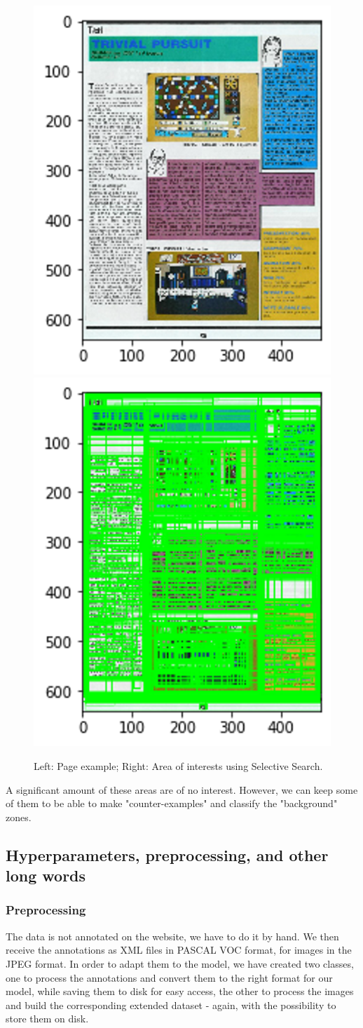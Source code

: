 \documentclass[10pt,conference,compsocconf]{IEEEtran}
\begin{document}
\begin{figure}[htbp]
    \centering
    \includegraphics[width=0.5\columnwidth]{example_page.png}\includegraphics[width=0.5\columnwidth]{example_page_ss.png}
    \caption{Left: Page example; Right: Area of interests using Selective Search.}
    \vspace{-3mm}
    \label{fig:pages-example}
\end{figure}

A significant amount of these areas are of no interest. However, we can keep some of them to be able to make "counter-examples" and classify the "background" zones.

\subsection{Hyperparameters, preprocessing, and other long words}
\subsubsection{Preprocessing}
The data is not annotated on the website, we have to do it by hand. We then receive the annotations as XML files in PASCAL VOC format, for images in the JPEG format. In order to adapt them to the model, we have created two classes, one to process the annotations and convert them to the right format for our model, while saving them to disk for easy access, the other to process the images and build the corresponding extended dataset - again, with the possibility to store them on disk.
\end{document}
